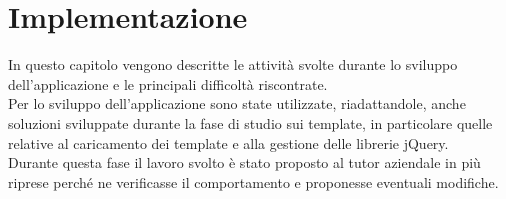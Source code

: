 
\chapter{Implementazione}
\label{cap:implementazione}
In questo capitolo vengono descritte le attività svolte durante lo sviluppo dell'applicazione e le principali difficoltà riscontrate.\\
Per lo sviluppo dell'applicazione sono state utilizzate, riadattandole, anche soluzioni sviluppate durante la fase di studio sui template, in particolare quelle relative al caricamento dei template e alla gestione delle librerie jQuery.\\
Durante questa fase il lavoro svolto è stato proposto al tutor aziendale in più riprese perché ne verificasse il comportamento e proponesse eventuali modifiche.

